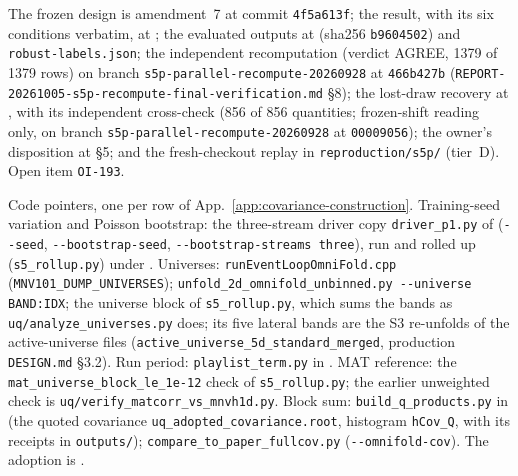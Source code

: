 \begin{description}[leftmargin=0pt,itemsep=3pt]
  \item[\texttt{joint-5d}.] The frozen design is amendment~7 at commit \texttt{4f5a613f}; the result, with its six conditions verbatim, at ; the evaluated outputs at  (sha256 \texttt{b9604502}) and \texttt{robust-labels.json}; the independent recomputation (verdict AGREE, 1379 of 1379 rows) on branch \texttt{s5p-parallel-recompute-20260928} at \texttt{466b427b} (\texttt{REPORT-20261005-s5p-recompute-final-verification.md} \S8); the lost-draw recovery at , with its independent cross-check (856 of 856 quantities; frozen-shift reading only, on branch \texttt{s5p-parallel-recompute-20260928} at \texttt{00009056}); the owner's disposition at  \S5; and the fresh-checkout replay in \texttt{reproduction/s5p/} (tier~D). Open item \texttt{OI-193}.
  \item[\texttt{variance-sources}.] Code pointers, one per row of App.~\ref{app:covariance-construction}. Training-seed variation and Poisson bootstrap: the three-stream driver copy \texttt{driver\_p1.py} of  (\texttt{-{}-seed}, \texttt{-{}-bootstrap-seed}, \texttt{-{}-bootstrap-streams three}), run and rolled up (\texttt{s5\_rollup.py}) under . Universes: \texttt{runEventLoopOmniFold.cpp} (\texttt{MNV101\_DUMP\_UNIVERSES}); \texttt{unfold\_2d\_omnifold\_unbinned.py -{}-universe BAND:IDX}; the universe block of \texttt{s5\_rollup.py}, which sums the bands as \texttt{uq/analyze\_universes.py} does; its five lateral bands are the S3 re-unfolds of the active-universe files (\texttt{active\_universe\_5d\_standard\_merged}, production \texttt{DESIGN.md} \S3.2). Run period: \texttt{playlist\_term.py} in . MAT reference: the \texttt{mat\_universe\_block\_le\_1e-12} check of \texttt{s5\_rollup.py}; the earlier unweighted check is \texttt{uq/verify\_matcorr\_vs\_mnvh1d.py}. Block sum: \texttt{build\_q\_products.py} in  (the quoted covariance \texttt{uq\_adopted\_covariance.root}, histogram \texttt{hCov\_Q}, with its receipts in \texttt{outputs/}); \texttt{compare\_to\_paper\_fullcov.py} (\texttt{-{}-omnifold-cov}). The adoption is .

\end{description}
